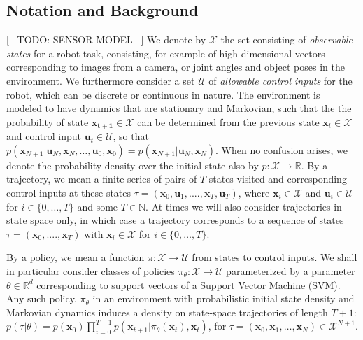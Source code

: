 \documentclass[10pt, conference]{ieeeconf}      %
\newcommand{\bu}{\mathbf{u}}
\newcommand{\bx}{\mathbf{x}}
\begin{document}
\subsection{Notation and Background}
{\color{blue} [-- TODO: SENSOR MODEL --]}
We denote by $\mathcal{X}$ the set consisting of \emph{observable states} for a robot task, consisting, for example of
high-dimensional vectors corresponding to images from a camera, or joint angles and object poses in the environment.
We furthermore consider a set $\mathcal{U}$ of \emph{allowable control inputs} for the robot, which can be discrete or continuous in
nature. The environment is
modeled to have dynamics that are stationary and Markovian, such that the the probability of state $\mathbf{x_{t+1}}\in
\mathcal{X}$ can be determined from the previous state $\mathbf{x}_t\in\mathcal{X}$ and control input $\mathbf{u}_t\in \mathcal{U}$,
so that $p(\bx_{N+1}|\bu_{N},\bx_{N}, \ldots, \bu_{0}, \bx_{0})=p(\bx_{N+1}|\bu_{N}, \bx_N)$.  
When no confusion arises, we denote the probability density over the initial state also by $p:\mathcal{X}\to
\mathbb{R}$. By a trajectory, we mean a finite series of pairs of $T$ states visited and corresponding
control inputs at these states $\tau = (\mathbf{x}_0,\mathbf{u}_1, ...., \mathbf{x}_T,\mathbf{u}_T)$, where $\bx_i\in \mathcal{X}$
and $\bu_i\in \mathcal{U}$ for $i\in \{0, \ldots, T\}$ and some $T\in \mathbb{N}$.  
At times we will also consider trajectories in state space only, in which case a trajectory corresponds
to a sequence of states $\tau = (\bx_0,....,\bx_T)$ with $\bx_i\in\mathcal{X}$ for $i\in \{0, \ldots, T\}$.


By a policy, we mean a function $\pi: \mathcal{X} \to \mathcal{U}$ from states to control inputs. 
We shall in particular consider classes of policies $\pi_{\theta}:\mathcal{X}\to \mathcal{U}$ parameterized by a
parameter $\theta\in \mathbb{R}^d$ corresponding to support vectors of a Support Vector Machine (SVM).
Any such policy, $\pi_{\theta}$ in an environment with probabilistic initial state density and Markovian dynamics
induces a density on state-space trajectories of length $T+1$: $p(\tau | \theta)=
p(\bx_0)\prod_{i=0}^{T-1}p(\bx_{t+1}|\pi_{\theta}(\bx_t),\bx_t)$, for $\tau = (\bx_0, \bx_1, \ldots, \bx_N)\in
\mathcal{X}^{N+1}$.
\end{document}
